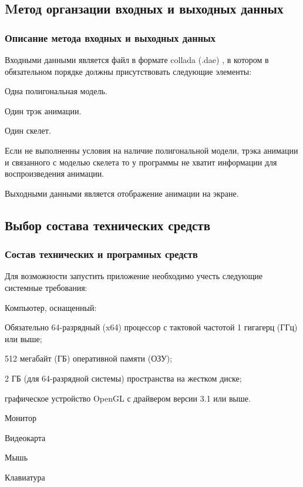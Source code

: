 \subsection{Mетод органзации входных и выходных данных}

\subsubsection{Описание метода входных и выходных данных}
Входными данными является файл в формате collada (.dae)
, в котором в обязательном порядке должны присутствовать следующие элементы:
\begin{my_enumerate}
\item Одна полигональная модель.
\item Один трэк анимации.
\item Один скелет.
\end{my_enumerate}

Если не выполненны условия на наличие полигональной модели,
трэка анимации и связанного с моделью скелета то
у программы не хватит информации для воспроизведения анимации.

Выходными данными является отображение анимации на экране.


\subsection{Выбор состава технических средств}

\subsubsection{Состав технических и програмных средств}
Для возможности запустить приложение необходимо учесть следующие системные требования:
\begin{my_enumerate}
\item Компьютер, оснащенный:
    \begin{my_enumerate}
    \item Обязательно 64-разрядный (x64) процессор с тактовой частотой 1 гигагерц (ГГц) или выше;
    \item 512 мегабайт (ГБ) оперативной памяти (ОЗУ);
    \item 2 ГБ (для 64-разрядной системы) пространства на жестком диске;
    \item графическое устройство OpenGL с драйвером версии 3.1 или выше.
    \end{my_enumerate}
\item Монитор
\item Видеокарта
\item Мышь
\item Клавиатура
\end{my_enumerate}

